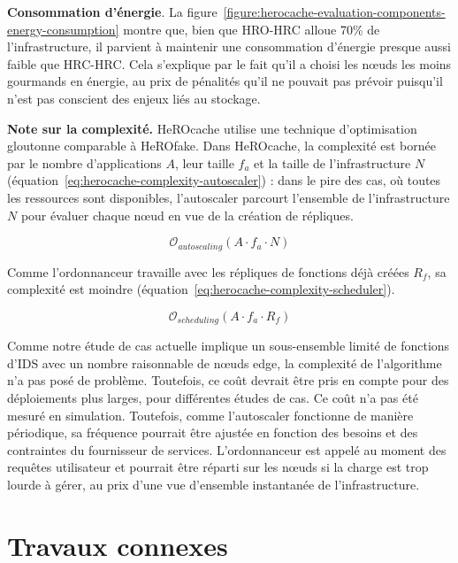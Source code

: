 \textbf{Consommation d'énergie}. La figure~\ref{figure:herocache-evaluation-components-energy-consumption} montre que, bien que HRO-HRC alloue 70\% de l'infrastructure, il parvient à maintenir une consommation d'énergie presque aussi faible que HRC-HRC. Cela s'explique par le fait qu'il a choisi les nœuds les moins gourmands en énergie, au prix de pénalités qu'il ne pouvait pas prévoir puisqu'il n'est pas conscient des enjeux liés au stockage.

\textbf{Note sur la complexité.} HeROcache utilise une technique d'optimisation gloutonne comparable à HeROfake. Dans HeROcache, la complexité est bornée par le nombre d'applications $A$, leur taille $f_{a}$ et la taille de l'infrastructure $N$ (équation~\ref{eq:herocache-complexity-autoscaler}) : dans le pire des cas, où toutes les ressources sont disponibles, l'autoscaler parcourt l'ensemble de l'infrastructure $N$ pour évaluer chaque nœud en vue de la création de répliques.

\begin{equation}
    \mathcal{O}_{autoscaling}(A \cdot f_{a} \cdot N)
\label{eq:herocache-complexity-autoscaler}
\end{equation}

Comme l'ordonnanceur travaille avec les répliques de fonctions déjà créées $R_{f}$, sa complexité est moindre (équation~\ref{eq:herocache-complexity-scheduler}).

\begin{equation}
    \mathcal{O}_{scheduling}(A \cdot f_{a} \cdot R_{f})
\label{eq:herocache-complexity-scheduler}
\end{equation}

Comme notre étude de cas actuelle implique un sous-ensemble limité de fonctions d'IDS avec un nombre raisonnable de nœuds edge, la complexité de l'algorithme n'a pas posé de problème. Toutefois, ce coût devrait être pris en compte pour des déploiements plus larges, pour différentes études de cas. Ce coût n'a pas été mesuré en simulation. Toutefois, comme l'autoscaler fonctionne de manière périodique, sa fréquence pourrait être ajustée en fonction des besoins et des contraintes du fournisseur de services. L'ordonnanceur est appelé au moment des requêtes utilisateur et pourrait être réparti sur les nœuds si la charge est trop lourde à gérer, au prix d'une vue d'ensemble instantanée de l'infrastructure.

\section{Travaux connexes}
\label{section:herocache-sota}

